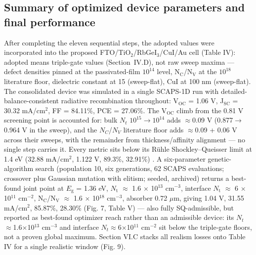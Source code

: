 \documentclass[review]{elsarticle}
\begin{document}
\subsection{Summary of optimized device parameters and final performance}
After completing the eleven sequential steps, the adopted values were incorporated into the proposed FTO/\allowbreak{}TiO$_{2}$/RbGeI$_{3}$/CuI/\allowbreak{}Au cell (Table IV): adopted means triple-gate values (Section~IV.D), not raw sweep maxima --- defect densities pinned at the passivated-film $10^{14}$ level, N$_{\mathrm{C}}$/N$_{\mathrm{V}}$ at the $10^{18}$ literature floor, dielectric constant at 15 (sweep-flat), CuI at 100 nm (sweep-flat). The consolidated device was simulated in a single SCAPS-1D run with detailed-balance-consistent radiative recombination throughout: V$_{\mathrm{OC}}$ = 1.06 V, J$_{\mathrm{SC}}$ = 30.32 mA/cm$^{2}$, FF = 84.11\%, PCE = 27.06\%. The V$_{\mathrm{OC}}$ climb from the 0.81 V screening point is accounted for: bulk $N_{t}$ $10^{15}$$\rightarrow$$10^{14}$ adds $\approx$0.09 V (0.877$\rightarrow$0.964 V in the sweep), and the $N_{C}$/$N_{V}$ literature floor adds $\approx$0.09 + 0.06 V across their sweeps, with the remainder from thickness/affinity alignment --- no single step carries it. Every metric sits below its R\"uhle Shockley--Queisser limit at 1.4 eV (32.88 mA/cm$^{2}$, 1.122 V, 89.3\%, 32.91\%) \cite{r36}. A six-parameter genetic-algorithm search (population 10, six generations, 62 SCAPS evaluations; crossover plus Gaussian mutation with elitism; seeded, archived) returns a best-found joint point at $E_{\mathrm{g}}$ = 1.36 eV, $N_{\mathrm{t}}$ $\approx$ 1.6 $\times$ 10$^{13}$ cm$^{-3}$, interface $N_{\mathrm{t}}$ $\approx$ 6 $\times$ 10$^{11}$ cm$^{-2}$, N$_{\mathrm{C}}$/N$_{\mathrm{V}}$ $\approx$ 1.6 $\times$ 10$^{18}$ cm$^{-3}$, absorber 0.72 $\mu$m, giving 1.04 V, 31.55 mA/cm$^{2}$, 85.87\%, 28.30\% (Fig. 7, Table V) --- also fully SQ-admissible, but reported as best-found optimizer reach rather than an admissible device: its $N_{t}$$\approx$1.6$\times$10$^{13}$ cm$^{-3}$ and interface $N_{t}$$\approx$6$\times$10$^{11}$ cm$^{-2}$ sit below the triple-gate floors, not a proven global maximum. Section VI.C stacks all realism losses onto Table IV for a single realistic window (Fig. 9).
\end{document}
